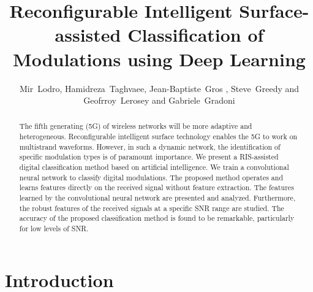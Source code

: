 \documentclass[summary]{ursi}
\title{Reconfigurable Intelligent Surface-assisted Classification of Modulations using Deep Learning}
\author{Mir~Lodro\affref{ref1}, Hamidreza~Taghvaee\affref{ref1}, Jean-Baptiste~Gros \affref{ref2}, Steve~Greedy\affref{ref1} and Geofrroy~Lerosey\affref{ref2}
  and Gabriele~Gradoni\affref{ref1}\affref{ref3}}
\affiliation{%
  \aff{ref1}{George Green Institute for Electromagnetics Research-GGIEMR, University of Nottingham, UK}
  \aff{ref2}{Greenerwave, Paris, France}
  \aff{ref3}{Maxwell Centre, Cavendish Laboratory, University of Cambridge, UK}
  
}
\begin{document}
\maketitle

\begin{abstract}
The fifth generating (5G) of wireless networks will be more adaptive and heterogeneous. Reconfigurable intelligent surface technology enables the 5G to work on multistrand waveforms. However, in such a dynamic network, the identification of specific modulation types is of paramount importance. We present a RIS-assisted digital classification method based on artificial intelligence. We train a convolutional neural network to classify digital modulations. The proposed method operates and learns features directly on the received signal without feature extraction. The features learned by the convolutional neural network are presented and analyzed. Furthermore, the robust features of the received signals at a specific SNR range are studied. The accuracy of the proposed classification method is found to be remarkable, particularly for low levels of SNR.
\end{abstract}

\section{Introduction}
\end{document}
